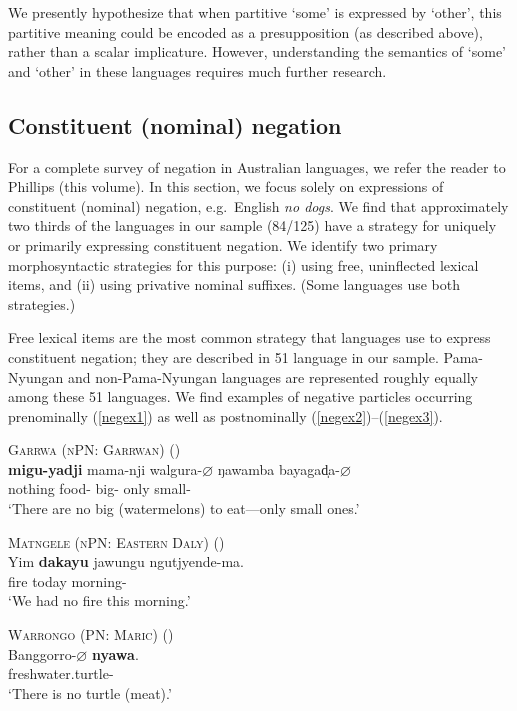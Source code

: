 \documentclass[12pt,egregdoesnotlikesansseriftitles]{scrartcl}
\newcommand{\ofy}{/125} %
\begin{document}
We presently hypothesize that when partitive `some' is expressed by `other', this partitive meaning could be encoded as a presupposition (as described above), rather than a scalar implicature.  However, understanding the semantics of `some' and `other' in these languages requires much further research.


\subsection{Constituent (nominal) negation}
\label{sec:neg}
For a complete survey of negation in Australian languages, we refer the reader to Phillips (this volume). In this section, we focus solely on expressions of constituent (nominal) negation, e.g.\ English \textit{no dogs}. We find that approximately two thirds of the languages in our sample (84\ofy) have a strategy for uniquely or primarily expressing constituent negation.  We identify two primary morphosyntactic  strategies for this purpose: (i) using free, uninflected lexical items, and (ii) using privative nominal suffixes. (Some languages use both strategies.)

Free lexical items are the most common strategy that languages use to express constituent negation; they are described in 51 language in our sample. Pama-Nyungan and non-Pama-Nyungan languages are represented roughly equally among these 51 languages. We find examples of negative particles occurring prenominally (\ref{negex1}) as well as postnominally (\ref{negex2})--(\ref{negex3}).

\begin{exe}
  \ex \textsc{Garrwa (nPN: Garrwan)} \hfill (\citealt[37]{furby77}) \\
  \gll \textbf{migu-yadji}    mama-nji    walgura-$\varnothing$    ŋawamba    bayagad̩a-$\varnothing$\\
  nothing  food-\Refr{} big-\Nom{} only  small-\Nom\\
  \glt `There are no big (watermelons) to eat---only small ones.' \label{negex1}

  \ex \textsc{Matngele (nPN: Eastern Daly)} \hfill (\citealt[102]{zandvoort99})\\
  \gll Yim \textbf{dakayu} jawungu ngutjyende-ma.\\
  fire \Neg{} today morning-\Prm\\
  \glt `We had no fire this morning.' \label{negex2} %

  \ex \textsc{Warrongo (PN: Maric)} \hfill (\citealt[660]{tsunoda11})\\
  \gll Banggorro-$\varnothing$ \textbf{nyawa}.\\
  freshwater.turtle-\Nom{} \Neg\\
  \glt `There is no turtle (meat).' \label{negex3}
\end{exe}
 
\end{document}
